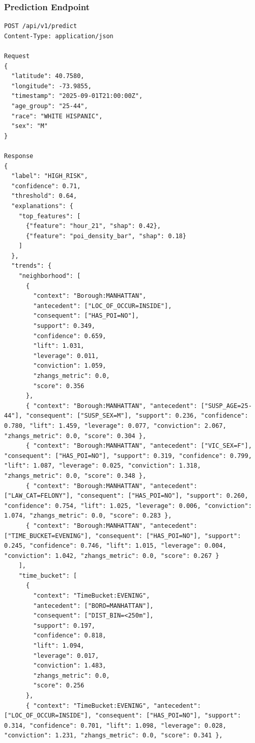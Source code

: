 \documentclass[11pt]{article}
\begin{document}
\subsubsection{Prediction Endpoint}
\begin{verbatim}
POST /api/v1/predict
Content-Type: application/json

Request
{
  "latitude": 40.7580,
  "longitude": -73.9855,
  "timestamp": "2025-09-01T21:00:00Z",
  "age_group": "25-44",
  "race": "WHITE HISPANIC",
  "sex": "M"
}

Response
{
  "label": "HIGH_RISK",
  "confidence": 0.71,
  "threshold": 0.64,
  "explanations": {
    "top_features": [
      {"feature": "hour_21", "shap": 0.42},
      {"feature": "poi_density_bar", "shap": 0.18}
    ]
  },
  "trends": {
    "neighborhood": [
      {
        "context": "Borough:MANHATTAN",
        "antecedent": ["LOC_OF_OCCUR=INSIDE"],
        "consequent": ["HAS_POI=NO"],
        "support": 0.349,
        "confidence": 0.659,
        "lift": 1.031,
        "leverage": 0.011,
        "conviction": 1.059,
        "zhangs_metric": 0.0,
        "score": 0.356
      },
      { "context": "Borough:MANHATTAN", "antecedent": ["SUSP_AGE=25-44"], "consequent": ["SUSP_SEX=M"], "support": 0.236, "confidence": 0.780, "lift": 1.459, "leverage": 0.077, "conviction": 2.067, "zhangs_metric": 0.0, "score": 0.304 },
      { "context": "Borough:MANHATTAN", "antecedent": ["VIC_SEX=F"], "consequent": ["HAS_POI=NO"], "support": 0.319, "confidence": 0.799, "lift": 1.087, "leverage": 0.025, "conviction": 1.318, "zhangs_metric": 0.0, "score": 0.348 },
      { "context": "Borough:MANHATTAN", "antecedent": ["LAW_CAT=FELONY"], "consequent": ["HAS_POI=NO"], "support": 0.260, "confidence": 0.754, "lift": 1.025, "leverage": 0.006, "conviction": 1.074, "zhangs_metric": 0.0, "score": 0.283 },
      { "context": "Borough:MANHATTAN", "antecedent": ["TIME_BUCKET=EVENING"], "consequent": ["HAS_POI=NO"], "support": 0.245, "confidence": 0.746, "lift": 1.015, "leverage": 0.004, "conviction": 1.042, "zhangs_metric": 0.0, "score": 0.267 }
    ],
    "time_bucket": [
      {
        "context": "TimeBucket:EVENING",
        "antecedent": ["BORO=MANHATTAN"],
        "consequent": ["DIST_BIN=<250m"],
        "support": 0.197,
        "confidence": 0.818,
        "lift": 1.094,
        "leverage": 0.017,
        "conviction": 1.483,
        "zhangs_metric": 0.0,
        "score": 0.256
      },
      { "context": "TimeBucket:EVENING", "antecedent": ["LOC_OF_OCCUR=INSIDE"], "consequent": ["HAS_POI=NO"], "support": 0.314, "confidence": 0.701, "lift": 1.098, "leverage": 0.028, "conviction": 1.231, "zhangs_metric": 0.0, "score": 0.341 },

\end{verbatim}
\end{document}
